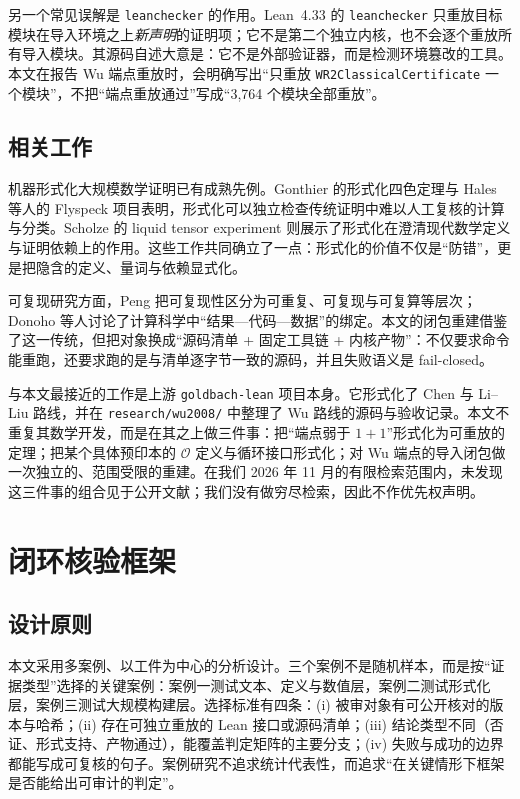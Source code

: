\documentclass[11pt,a4paper]{ctexart}
\theoremstyle{plain}
\theoremstyle{definition}
\begin{document}
另一个常见误解是 \texttt{leanchecker} 的作用。Lean~4.33 的 \texttt{leanchecker} 只重放目标模块在导入环境之上\emph{新声明}的证明项；它不是第二个独立内核，也不会逐个重放所有导入模块。其源码自述大意是：它不是外部验证器，而是检测环境篡改的工具。本文在报告 Wu 端点重放时，会明确写出“只重放 \texttt{WR2ClassicalCertificate} 一个模块”，不把“端点重放通过”写成“3,764 个模块全部重放”。

\subsection{相关工作}
\label{sec:related}

机器形式化大规模数学证明已有成熟先例。Gonthier 的形式化四色定理\cite{gonthier2008}与 Hales 等人的 Flyspeck 项目\cite{hales2017}表明，形式化可以独立检查传统证明中难以人工复核的计算与分类。Scholze 的 liquid tensor experiment 则展示了形式化在澄清现代数学定义与证明依赖上的作用\cite{scholze2022}。这些工作共同确立了一点：形式化的价值不仅是“防错”，更是把隐含的定义、量词与依赖显式化。

可复现研究方面，Peng 把可复现性区分为可重复、可复现与可复算等层次\cite{peng2011}；Donoho 等人讨论了计算科学中“结果—代码—数据”的绑定\cite{donoho2009}。本文的闭包重建借鉴了这一传统，但把对象换成“源码清单 + 固定工具链 + 内核产物”：不仅要求命令能重跑，还要求跑的是与清单逐字节一致的源码，并且失败语义是 fail-closed。

与本文最接近的工作是上游 \texttt{goldbach-lean} 项目本身\cite{upstream}。它形式化了 Chen 与 Li--Liu 路线，并在 \texttt{research/wu2008/} 中整理了 Wu 路线的源码与验收记录。本文不重复其数学开发，而是在其之上做三件事：把“端点弱于 $1+1$”形式化为可重放的定理；把某个具体预印本的 $\mathcal O$ 定义与循环接口形式化；对 Wu 端点的导入闭包做一次独立的、范围受限的重建。在我们 2026 年 11 月的有限检索范围内，未发现这三件事的组合见于公开文献；我们没有做穷尽检索，因此不作优先权声明。

\section{闭环核验框架}
\label{sec:framework}

\subsection{设计原则}
\label{sec:principles}

本文采用多案例、以工件为中心的分析设计。三个案例不是随机样本，而是按“证据类型”选择的关键案例：案例一测试文本、定义与数值层，案例二测试形式化层，案例三测试大规模构建层。选择标准有四条：(i) 被审对象有可公开核对的版本与哈希；(ii) 存在可独立重放的 Lean 接口或源码清单；(iii) 结论类型不同（否证、形式支持、产物通过），能覆盖判定矩阵的主要分支；(iv) 失败与成功的边界都能写成可复核的句子。案例研究不追求统计代表性，而追求“在关键情形下框架是否能给出可审计的判定”。
\end{document}
